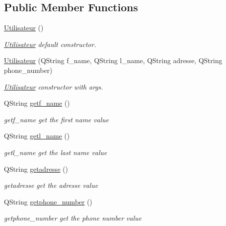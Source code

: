 \subsection*{Public Member Functions}
\begin{DoxyCompactItemize}
\item 
\mbox{\label{class_utilisateur_ae76433a6d353c5f5ad0c6a6af64022ad}} 
\mbox{\hyperlink{class_utilisateur_ae76433a6d353c5f5ad0c6a6af64022ad}{Utilisateur}} ()
\begin{DoxyCompactList}\small\item\em \mbox{\hyperlink{class_utilisateur}{Utilisateur}} default constructor. \end{DoxyCompactList}\item 
\mbox{\hyperlink{class_utilisateur_a0fe9888099a1e40be648157536f645be}{Utilisateur}} (Q\+String f\+\_\+name, Q\+String l\+\_\+name, Q\+String adresse, Q\+String phone\+\_\+number)
\begin{DoxyCompactList}\small\item\em \mbox{\hyperlink{class_utilisateur}{Utilisateur}} constructor with args. \end{DoxyCompactList}\item 
Q\+String \mbox{\hyperlink{class_utilisateur_ad5f75703c1b9b5e4a66490a4641deb33}{getf\+\_\+name}} ()
\begin{DoxyCompactList}\small\item\em getf\+\_\+name get the first name value \end{DoxyCompactList}\item 
Q\+String \mbox{\hyperlink{class_utilisateur_a8ee5dd09a7d1678a4a98a9c4820ac007}{getl\+\_\+name}} ()
\begin{DoxyCompactList}\small\item\em getl\+\_\+name get the last name value \end{DoxyCompactList}\item 
Q\+String \mbox{\hyperlink{class_utilisateur_aae3c96e98522e6bfb9f97991e454f2bd}{getadresse}} ()
\begin{DoxyCompactList}\small\item\em getadresse get the adresse value \end{DoxyCompactList}\item 
Q\+String \mbox{\hyperlink{class_utilisateur_af2657b63d087c8e8430b8dc00d2117aa}{getphone\+\_\+number}} ()
\begin{DoxyCompactList}\small\item\em getphone\+\_\+number get the phone number value \end{DoxyCompactList}\item 

\end{DoxyCompactItemize}
